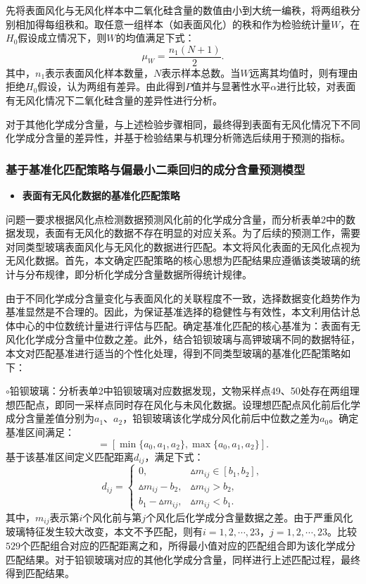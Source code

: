 \documentclass[withoutpreface,bwprint]{cumcmthesis} %
\begin{document}
先将表面风化与无风化样本中二氧化硅含量的数值由小到大统一编秩，将两组秩分别相加得每组秩和。取任意一组样本（如表面风化）的秩和作为检验统计量$W$，在$H_0$假设成立情况下，则$W$的均值满足下式：
\begin{equation}
\mu_W = \frac{n_1(N+1)}{2}.
\end{equation}
其中，$n_1$表示表面风化样本数量，$N$表示样本总数。当$W$远离其均值时，则有理由拒绝$H_0$假设，认为两组有差异。由此得到$P$值并与显著性水平$\alpha$进行比较，对表面有无风化情况下二氧化硅含量的差异性进行分析。

对于其他化学成分含量，与上述检验步骤相同，最终得到表面有无风化情况下不同化学成分含量的差异性，并基于检验结果与机理分析筛选后续用于预测的指标。

\subsubsection{基于基准化匹配策略与偏最小二乘回归的成分含量预测模型}
\label{jizhun}

\begin{itemize}
  \item \textbf{表面有无风化数据的基准化匹配策略}
\end{itemize}

问题一要求根据风化点检测数据预测风化前的化学成分含量，而分析表单2中的数据发现，表面有无风化的数据不存在明显的对应关系。为了后续的预测工作，需要对同类型玻璃表面风化与无风化的数据进行匹配。本文将风化表面的无风化点视为无风化数据。首先，本文确定匹配策略的核心思想为匹配结果应遵循该类玻璃的统计与分布规律，即分析化学成分含量数据所得统计规律。

由于不同化学成分含量变化与表面风化的关联程度不一致，选择数据变化趋势作为基准显然是不合理的。因此，为保证基准选择的稳健性与有效性，本文利用估计总体中心的中位数统计量进行评估与匹配。确定基准化匹配的核心基准为：表面有无风化化学成分含量中位数之差。此外，结合铅钡玻璃与高钾玻璃不同的数据特征，本文对匹配基准进行适当的个性化处理，得到不同类型玻璃的基准化匹配策略如下：

$\circ$铅钡玻璃：分析表单2中铅钡玻璃对应数据发现，文物采样点49、50处存在两组理想匹配点，即同一采样点同时存在风化与未风化数据。设理想匹配点风化前后化学成分含量差值分别为$a_1$、$a_2$，铅钡玻璃该化学成分风化前后中位数之差为$a_0$。确定基准区间满足：
\begin{equation}
 [b_1,b_2] = [\min\{a_0,a_1,a_2\},\max\{a_0,a_1,a_2\}].
\end{equation}
基于该基准区间定义匹配距离$d_{ij}$，满足下式：
\begin{equation}
 d_{ij} = \begin{cases}
  0, & {\vartriangle m_{ij} \in [b_1,b_2],}\\
  {\vartriangle m_{ij} - b_2,} & {\vartriangle m_{ij} > b_2,}\\
  {b_1 - \vartriangle m_{ij},} & {\vartriangle m_{ij} < b_1.}
 \end{cases}
\end{equation}
其中，$m_{ij}$表示第$i$个风化前与第$j$个风化后化学成分含量数据之差。由于严重风化玻璃特征发生较大改变，本文不予匹配，则有$i = 1,2,\cdots,23$，$j = 1,2,\cdots,23$。比较$529$个匹配组合对应的匹配距离之和，所得最小值对应的匹配组合即为该化学成分匹配结果。对于铅钡玻璃对应的其他化学成分含量，同样进行上述匹配过程，最终得到匹配结果。
\end{document}
